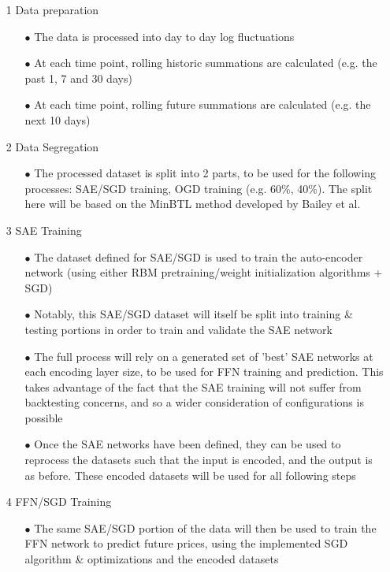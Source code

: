 \documentclass[a4paper,latin]{paper}
\begin{document}
\begin{itemize}
	\item [1] Data preparation
	\begin{itemize}
		\item[$\bullet$] The data is processed into day to day log fluctuations
		\item[$\bullet$] At each time point, rolling historic summations are calculated (e.g. the past 1, 7 and 30 days) 
		\item[$\bullet$] At each time point, rolling future summations are calculated (e.g. the next 10 days) 
	\end{itemize}
	\item [2] Data Segregation
	\begin{itemize}
		\item[$\bullet$] The processed dataset is split into 2 parts, to be used for the following processes: SAE/SGD training, OGD training (e.g. 60\%, 40\%). The split here will be based on the MinBTL method developed by Bailey et al. 
	\end{itemize}	
	\item [3] SAE Training
	\begin{itemize}
		\item[$\bullet$] The dataset defined for SAE/SGD is used to train the auto-encoder network (using either RBM pretraining/weight initialization algorithms + SGD)
		\item[$\bullet$] Notably, this SAE/SGD dataset will itself be split into training \& testing portions in order to train and validate the SAE network
		\item[$\bullet$] The full process will rely on a generated set of 'best' SAE networks at each encoding layer size, to be used for FFN training and prediction. This takes advantage of the fact that the SAE training will not suffer from backtesting concerns, and so a wider consideration of configurations is possible
		\item[$\bullet$] Once the SAE networks have been defined, they can be used to reprocess the datasets such that the input is encoded, and the output is as before. These encoded datasets will be used for all following steps
	\end{itemize}		
	\item [4] FFN/SGD Training
	\begin{itemize}
		\item[$\bullet$] The same SAE/SGD portion of the data will then be used to train the FFN network to predict future prices, using the implemented SGD algorithm \& optimizations and the encoded datasets

\end{itemize}
\end{itemize}
\end{document}
